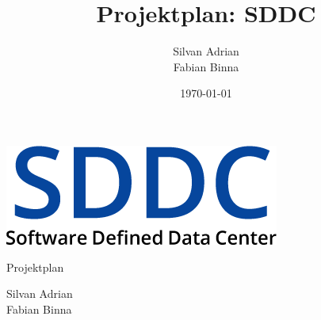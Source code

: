 \documentclass[11pt]{scrartcl}
\title{Projektplan: SDDC}
\author{Silvan Adrian \\ Fabian Binna}
\date{\today{}}
\begin{document}
\def\arraystretch{1.5}
\begin{titlepage}
\begin{center}
\vspace{10em}
\includegraphics[scale=2]{SDDC}
\vspace{10em}
\end{center}
\begin{center}
\huge {Projektplan}
\end{center}
\begin{center}
\vspace{10em}
\LARGE {Silvan Adrian} \\
\LARGE {Fabian Binna}
\end{center}

\end{titlepage}

\newpage
\end{document}
